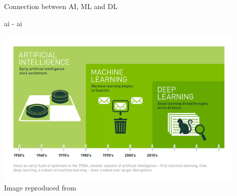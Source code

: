 \begin{frame}{Connection between AI, ML and DL}

\gls{ai} -
\gls{ai}

    \begin{center}
        \includegraphics[width=0.90\textwidth]{./images/dl_intro/ai_ml_dl.png}\\
        {\scriptsize Image reproduced from \cite{NVidiaBlog:DifferenceBetweenAIMLDL}}\\
    \end{center}

\end{frame}
    

